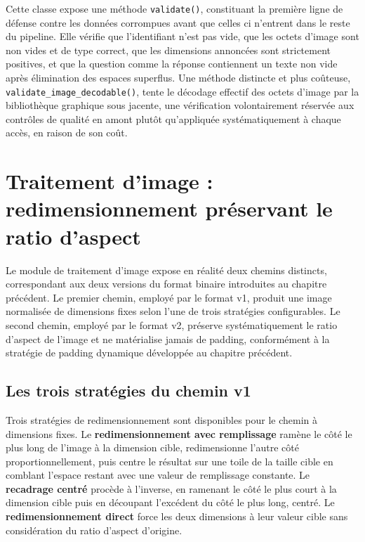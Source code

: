 \documentclass[12pt,a4paper]{report}
\begin{document}
Cette classe expose une méthode \texttt{validate()}, constituant la première ligne de défense contre les données corrompues avant que celles ci n'entrent dans le reste du pipeline. Elle vérifie que l'identifiant n'est pas vide, que les octets d'image sont non vides et de type correct, que les dimensions annoncées sont strictement positives, et que la question comme la réponse contiennent un texte non vide après élimination des espaces superflus. Une méthode distincte et plus coûteuse, \texttt{validate\_image\_decodable()}, tente le décodage effectif des octets d'image par la bibliothèque graphique sous jacente, une vérification volontairement réservée aux contrôles de qualité en amont plutôt qu'appliquée systématiquement à chaque accès, en raison de son coût.

\section{Traitement d'image : redimensionnement préservant le ratio d'aspect}
\label{sec:image_processing}

Le module de traitement d'image expose en réalité deux chemins distincts, correspondant aux deux versions du format binaire introduites au chapitre précédent. Le premier chemin, employé par le format v1, produit une image normalisée de dimensions fixes selon l'une de trois stratégies configurables. Le second chemin, employé par le format v2, préserve systématiquement le ratio d'aspect de l'image et ne matérialise jamais de padding, conformément à la stratégie de padding dynamique développée au chapitre précédent.

\subsection{Les trois stratégies du chemin v1}

Trois stratégies de redimensionnement sont disponibles pour le chemin à dimensions fixes. Le \textbf{redimensionnement avec remplissage} ramène le côté le plus long de l'image à la dimension cible, redimensionne l'autre côté proportionnellement, puis centre le résultat sur une toile de la taille cible en comblant l'espace restant avec une valeur de remplissage constante. Le \textbf{recadrage centré} procède à l'inverse, en ramenant le côté le plus court à la dimension cible puis en découpant l'excédent du côté le plus long, centré. Le \textbf{redimensionnement direct} force les deux dimensions à leur valeur cible sans considération du ratio d'aspect d'origine.
\end{document}
